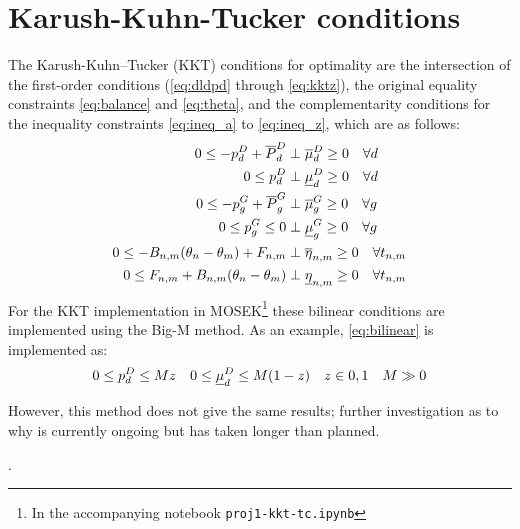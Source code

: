 \documentclass[11pt,a4paper]{article}
\numberwithin{equation}{section}
\begin{document}
\section{Karush-Kuhn-Tucker conditions}
\label{sec:kkt}
The Karush-Kuhn–Tucker (KKT) conditions for optimality are the intersection of the first-order conditions (\cref{eq:dldpd} through \cref{eq:kktz}), the original equality constraints \cref{eq:balance} and \cref{eq:theta}, and the complementarity conditions for the inequality constraints \cref{eq:ineq_a} to \cref{eq:ineq_z}, which are as follows:
\begin{align}
0 \leq - p^D_d + \overline{P}^D_d &\perp \overline{\mu}_d^D \geq 0 \quad \forall d  \\
0 \leq p^D_d &\perp \underline{\mu}_d^D \geq 0 \quad \forall d  \label{eq:bilinear} \\
0 \leq - p^G_g + \overline{P}^G_g &\perp \overline{\mu}_g^G \geq 0 \quad \forall g  \\
0 \leq p^G_g \leq 0 &\perp \underline{\mu}_g^G \geq 0 \quad \forall g  \\
0 \leq - B_{n,m}(\theta_n - \theta_m) + F_{n,m} &\perp \overline{\eta}_{n,m} \geq 0 \quad \forall t_{n,m} \\
0 \leq F_{n,m} + B_{n,m}(\theta_n - \theta_m) &\perp \underline{\eta}_{n,m} \geq 0 \quad \forall t_{n,m}
\end{align}
For the KKT implementation in MOSEK\footnote{
In the accompanying notebook \texttt{proj1-kkt-tc.ipynb}
} these bilinear conditions are implemented using the Big-M method.
As an example, \cref{eq:bilinear} is implemented as:
\begin{align}
0 \leq p^D_d &\leq  M z & 0 \leq \underline{\mu}_d^D &\leq  M (1-z) & z &\in {0, 1}  & M \gg 0
\end{align}

However, this method does not give the same results; further investigation as to why is currently ongoing but has taken longer than planned. 

\renewcommand{\refname}{\section{References}}.

\end{document}
